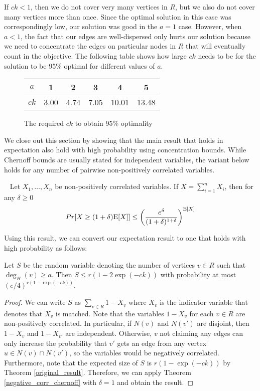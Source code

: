 If $ck<1$, then we do not cover very
many vertices in $R$, but we also do not cover many vertices more than
once. Since the optimal solution in this case was correspondingly low,
our solution was good in the $a=1$ case. However, when $a<1$, the fact
that our edges are well-dispersed only hurts our solution because we
need to concentrate the edges on particular nodes in $R$ that will eventually 
count in the objective. The following table shows how large $ck$ needs to be for the
solution to be 95\% optimal for different values of $a$.
\begin{figure}[h]
  \centering
  \begin{tabular}{ |c|c|c|c|c|c| }
    \hline
    $a$ & 1 & 2 & 3 & 4 & 5 \\ \hline
    $ck$ & 3.00 & 4.74 & 7.05 & 10.01 & 13.48 \\
    \hline
  \end{tabular}
  \caption{The required $ck$ to obtain 95\% optimality}
\end{figure} 

We close out this section by showing that the main result that holds in expectation also hold with high probability using concentration bounds. 
While Chernoff bounds are usually stated for independent variables, the
variant below holds for any number of pairwise non-positively correlated
variables.

\begin{thm}\label{negative_corr_chernoff}~\cite{AugerDoerr2011}
Let $X_1,\ldots, X_n$ be non-positively correlated variables. If $X=\sum_{i=1}^n X_i$, then for any $\delta\geq 0$
\[ Pr[X \geq (1+\delta)\text{E}[X] ] \leq \left(\frac{e^\delta}{(1+\delta)^{1+\delta}}\right)^{\text{E}[X]} \]
\end{thm}

Using this result, we can convert our expectation result to one that holds
with high probability as follows:

\begin{thm}
Let $S$ be the random variable denoting the number of vertices $v \in R$ such that $\deg_{H}(v)\geq a$. Then
$ S \leq r(1-2\exp(-ck))$ with probability at most $(e/4)^{r(1-\exp(-ck))}$.
\end{thm}

\begin{proof}
We can write $S$ as $\sum_{v\in R} 1-X_v$ where $X_v$ is the indicator
variable that denotes that $X_v$ is matched. Note that the variables 
$1-X_v$ for each $v\in R$ are non-positively correlated. In particular,
if $N(v)$ and $N(v')$ are disjoint, then $1-X_v$ and $1-X_{v'}$ are 
independent. Otherwise, $v$ not claiming any edges can only increase 
the probability that $v'$ gets an edge from any vertex
$u\in N(v)\cap N(v')$, so the variables would be negatively correlated.
Furthermore, note that the expected size of $S$ is $r(1-\exp(-ck))$ by
Theorem \ref{original_result}. Therefore, we can apply Theorem 
\ref{negative_corr_chernoff} with $\delta=1$ and obtain the result.
\end{proof}
